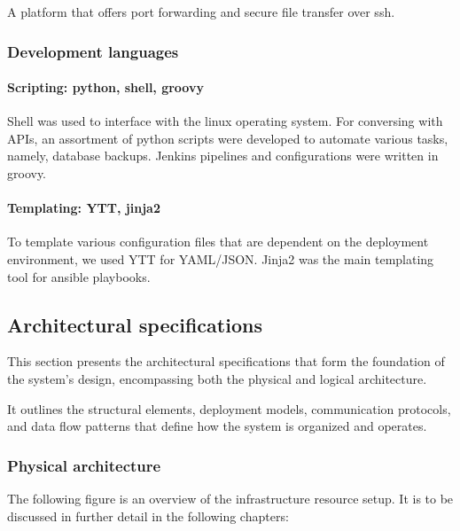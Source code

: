 \hspace{7mm}A platform that offers port forwarding and secure file transfer over ssh. 

\subsubsection{Development languages }

\paragraph{Scripting: python\cite{Python}, shell, groovy\cite{Groovy} }

\hspace{7mm}Shell was used to interface with the linux operating system. For conversing with APIs, an assortment of python scripts were developed to automate various tasks, namely, database backups. Jenkins pipelines and configurations were written in groovy. 

\paragraph{Templating: YTT\cite{YTT}, jinja2\cite{Jinja2} }

\hspace{7mm}To template various configuration files that are dependent on the deployment environment, we used YTT for YAML/JSON. Jinja2 was the main templating tool for ansible playbooks. 

\newpage

\subsection{Architectural specifications}

\hspace{7mm}This section presents the architectural specifications that form the foundation of the system's design, encompassing both the physical and logical architecture.

\hspace{7mm}It outlines the structural elements, deployment models, communication protocols, and data flow patterns that define how the system is organized and operates.

\subsubsection{Physical architecture}

\hspace{7mm}The following figure is an overview of the infrastructure resource setup. It is to be discussed in further detail in the following chapters:

